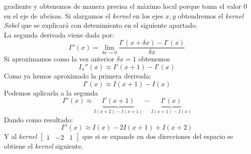 gradiente y obtenemos de manera precisa el máximo local porque toma el
valor $0$ en el eje de abcisas. Si alargamos el \emph{kernel} en los
ejes $x, y$ obtendremos el \emph{kernel}
\emph{Sobel} que se explicará con detenimiento en el siguiente apartado. \\
La segunda derivada viene dada por:
\begin{equation*}
  I''(x) = \lim_{\delta x \to 0}\frac{I'(x+\delta x) - I'(x)}{\delta x}
\end{equation*}
Si aproximamos como la vez anterior $\delta x = 1$ obtenemos
\begin{equation*}
  I_x''(x) \approx I'(x + 1) - I'(x)
\end{equation*}
Como ya hemos aproximado la primera derivada:
\begin{equation*}
  I'(x) \approx I(x + 1) - I(x)
\end{equation*}
Podemos aplicarla a la segunda
\begin{equation*}
  I''(x) \approx \underbrace{I'(x + 1)}_{I(x + 2) - I(x + 1)} - \underbrace{I'(x)}_{I(x + 1) - I(x)}
\end{equation*}
Dando como resultado:
\begin{equation*}
  I''(x) \approx I(x) - 2I(x + 1) + I(x + 2)
\end{equation*}
Y al \emph{kernel} $\begin{bmatrix} 1 & -2 & 1 \end{bmatrix}$ que si
se expande en dos direcciones del espacio se obtiene el \emph{kernel} siguiente.
